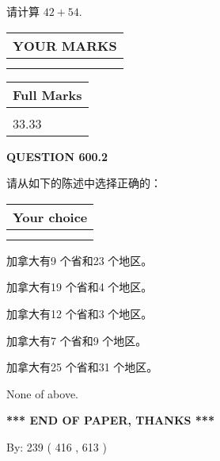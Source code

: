 \documentclass{ctexart}
\begin{document}
  
 
请计算 $ %
42 +  %
54 $.
 

 

 
  
\vspace{0.2in}
  
\noindent\begin{tabular}{|l|}
\hline
 YOUR MARKS  \\
\hline
 \\ 
 \\ 
\hline
\end{tabular}
\hspace{0.05in} \begin{tabular}{|l|}
\hline
 Full Marks  \\
\hline
 \\ 
33.33 \\
\hline
\end{tabular}
{\textbf{\Large{QUESTION
600.2 
}}}
  
  
请从如下的陈述中选择正确的：
  
  
\noindent\hspace{3.0in} \begin{tabular}{|l|}
\hline
Your choice \\
\hline
 \\ 
 \\ 
\hline
\end{tabular}
  
  
 
 
加拿大有9 个省和23 个地区。
 
 
加拿大有19 个省和4 个地区。
 
 
加拿大有12 个省和3 个地区。
 
 
加拿大有7 个省和9 个地区。
 
 
加拿大有25 个省和31 个地区。
 
 
 None of above.
 
 
   
   
 \vspace{0.2in}
 
   
   
   
   
\vspace{1.0in} 
{\textbf{\large{ *** END OF PAPER, THANKS *** }}} 
   
   
\hspace{1.0in} By: 
 239 ( 416 ,  613 )
   
\end{document}
